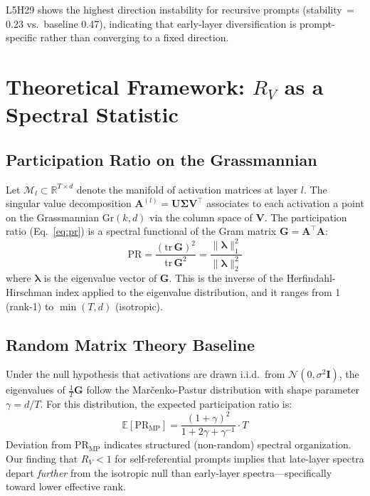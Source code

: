 \documentclass{article}
\newcommand{\RV}{R_V}
\newcommand{\PR}{\text{PR}}
\begin{document}
L5H29 shows the highest direction instability for recursive prompts (stability$\,{=}\,$0.23 vs.\ baseline 0.47), indicating that early-layer diversification is prompt-specific rather than converging to a fixed direction.


\section{Theoretical Framework: $\RV$ as a Spectral Statistic}
\label{app:theory}

\subsection{Participation Ratio on the Grassmannian}

Let $\mathcal{M}_l \subset \mathbb{R}^{T \times d}$ denote the manifold of activation matrices at layer $l$.
The singular value decomposition $\mathbf{A}^{(l)} = \mathbf{U} \boldsymbol{\Sigma} \mathbf{V}^\top$ associates to each activation a point on the Grassmannian $\text{Gr}(k, d)$ via the column space of $\mathbf{V}$.
The participation ratio (Eq.~\ref{eq:pr}) is a spectral functional of the Gram matrix $\mathbf{G} = \mathbf{A}^\top \mathbf{A}$:
\begin{equation}
    \PR = \frac{(\text{tr}\,\mathbf{G})^2}{\text{tr}\,\mathbf{G}^2} = \frac{\|\boldsymbol{\lambda}\|_1^2}{\|\boldsymbol{\lambda}\|_2^2}
\end{equation}
where $\boldsymbol{\lambda}$ is the eigenvalue vector of $\mathbf{G}$.
This is the inverse of the Herfindahl-Hirschman index applied to the eigenvalue distribution, and it ranges from 1 (rank-1) to $\min(T, d)$ (isotropic).

\subsection{Random Matrix Theory Baseline}

Under the null hypothesis that activations are drawn i.i.d.\ from $\mathcal{N}(0, \sigma^2 \mathbf{I})$, the eigenvalues of $\frac{1}{T}\mathbf{G}$ follow the Mar\v{c}enko-Pastur distribution \citep{marchenko1967distribution} with shape parameter $\gamma = d/T$.
For this distribution, the expected participation ratio is:
\begin{equation}
    \mathbb{E}[\PR_{\text{MP}}] = \frac{(1 + \gamma)^2}{1 + 2\gamma + \gamma^{-1}} \cdot T
\end{equation}
Deviation from $\PR_{\text{MP}}$ indicates structured (non-random) spectral organization.
Our finding that $\RV < 1$ for self-referential prompts implies that late-layer spectra depart \emph{further} from the isotropic null than early-layer spectra---specifically toward lower effective rank.
\end{document}
